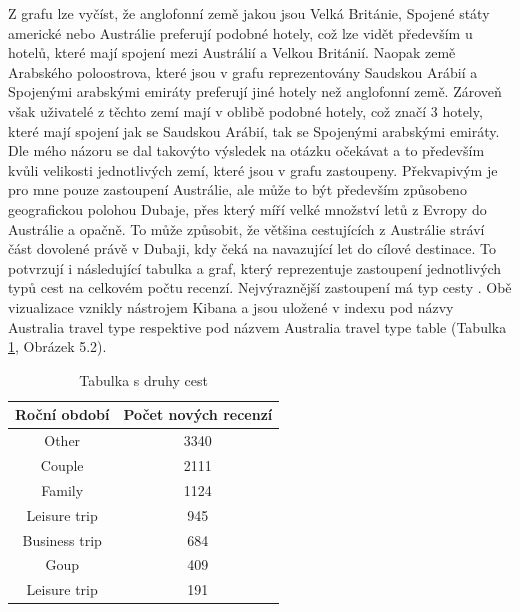 \documentclass[czech,BP]{thesiskiv}
\begin{document}
Z grafu lze vyčíst, že anglofonní země jakou jsou Velká Británie, Spojené státy americké nebo Austrálie preferují podobné hotely, což lze vidět především u hotelů, které mají spojení mezi Austrálií a Velkou Británií. Naopak země Arabského poloostrova, které jsou v grafu reprezentovány Saudskou Arábií a Spojenými arabskými emiráty preferují jiné hotely než anglofonní země. Zároveň však uživatelé z těchto zemí mají v oblibě podobné hotely, což značí 3 hotely, které mají spojení jak se Saudskou Arábií, tak se Spojenými arabskými emiráty. Dle mého názoru se dal takovýto výsledek na otázku očekávat a to především kvůli velikosti jednotlivých zemí, které jsou v grafu zastoupeny. Překvapivým je pro mne pouze zastoupení Austrálie, ale může to být především způsobeno geografickou polohou Dubaje, přes který míří velké množství letů z Evropy do Austrálie a opačně. To může způsobit, že většina cestujících z Austrálie stráví část dovolené právě v Dubaji, kdy čeká na navazující let do cílové destinace. To potvrzují i následující tabulka a graf, který reprezentuje zastoupení jednotlivých typů cest na celkovém počtu recenzí. Nejvýraznější zastoupení má typ cesty . Obě vizualizace vznikly nástrojem Kibana a jsou uložené v indexu  pod názvy Australia travel type respektive pod názvem Australia travel type table (Tabulka \ref{tab:rozlozeniAustralanu}, Obrázek 5.2).

\begin{table}[h]
	\centering
	
	\begin{tabular}{c|c}
		\hline
		\multicolumn{1}{l|}{\textbf{Roční období}} & \multicolumn{1}{l}{\textbf{Počet nových recenzí}} \\ \hline
		Other                                        &  3340                                              \\ 
		Couple                                        &  2111                                            \\ 
		Family                                        &  1124                                              \\ 
		Leisure trip                                      &  945                                              \\ 
		Business trip                                      &  684                                              \\ 
		Goup                                      &  409                                              \\ 
		Leisure trip                                      &  191                                              \\ \hline
	\end{tabular}
\caption{Tabulka s druhy cest}	\label{tab:rozlozeniAustralanu}
\end{table}
\end{document}
